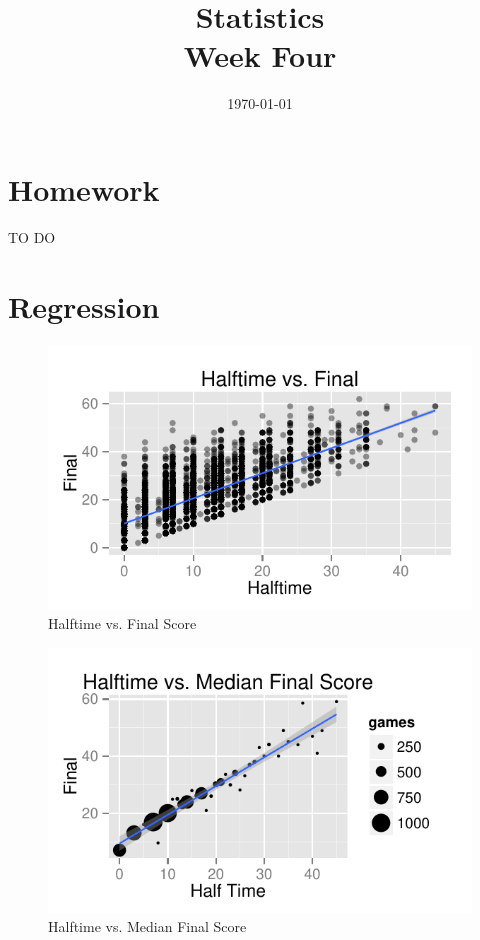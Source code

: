 \documentclass{exam}
\title{Statistics \\ Week Four}
\date{\today}
\author{}
\begin{document}
\maketitle
\tableofcontents

  \section{Homework}

  \begin{itemize*}
    \item TO DO
  \end{itemize*}

  \section{Regression}

  \begin{figure}[H]
    \centering
    \includegraphics{figures/nfl/ht_vs_final.pdf}
    \caption{Halftime vs. Final Score}
  \end{figure}

  \begin{figure}[H]
    \centering
    \includegraphics{figures/nfl/ht_vs_median_final.pdf}
    \caption{Halftime vs. Median Final Score}
  \end{figure}
\end{document}
